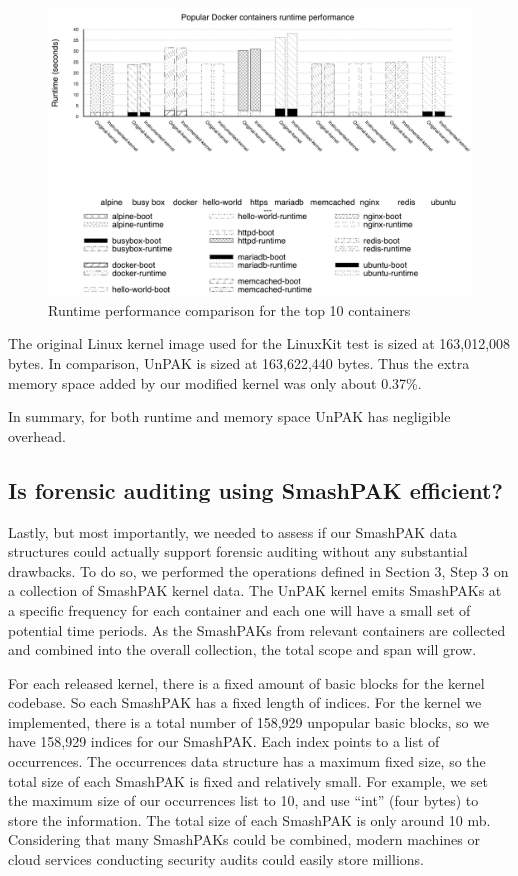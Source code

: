 \begin{figure}
\includegraphics[width=1.0\columnwidth]{diagram/performance.png}
\caption{\small Runtime performance comparison for the top 10 containers}
\label{fig:performance}
\end{figure}

The original Linux kernel image used for the LinuxKit test  is sized at 163,012,008 bytes. In comparison, UnPAK is sized at 163,622,440 bytes. 
Thus the extra memory space added by our modified kernel was only about 0.37\%. 

In summary, for both runtime and memory space UnPAK has negligible overhead.

\subsection{Is forensic auditing using SmashPAK efficient?}
\label{sec.evaluation.5} 
Lastly, but most importantly, we needed to assess if our SmashPAK data structures could actually support  forensic auditing without any substantial drawbacks. 
To do so, we performed the  operations defined in Section 3, Step 3 on a collection of SmashPAK kernel data. 
The UnPAK kernel emits SmashPAKs at a specific frequency for each container and each one will have a small set of potential time periods.  
As the SmashPAKs from relevant containers are collected and combined into the overall collection, the total scope and span will grow. 

For each released kernel, there is a fixed amount of basic blocks for the kernel codebase. So each SmashPAK has a fixed length of indices. 
For the kernel we implemented, there is a total number of 158,929 unpopular basic blocks, so we have 158,929 indices for our SmashPAK. 
Each index points to a list of occurrences. The occurrences data structure has a maximum fixed size, so the total size of each SmashPAK is fixed and relatively small. 
For example, we set the maximum size of our occurrences list to 10, and use ``int'' (four bytes) to store the information. 
The total size of each SmashPAK is only around 10 mb. Considering that many SmashPAKs could be combined, 
modern machines or cloud services conducting security audits could easily store millions. 

